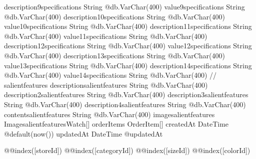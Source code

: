 {  description9specifications  String                      @db.VarChar(400)
  value9specifications        String                      @db.VarChar(400)
  description10specifications String                      @db.VarChar(400)
  value10specifications       String                      @db.VarChar(400)
  description11specifications String                      @db.VarChar(400)
  value11specifications       String                      @db.VarChar(400)
  description12specifications String                      @db.VarChar(400)
  value12specifications       String                      @db.VarChar(400)
  description13specifications String                      @db.VarChar(400)
  value13specifications       String                      @db.VarChar(400)
  description14specifications String                      @db.VarChar(400)
  value14specifications       String                      @db.VarChar(400)
  // salientfeatures
  descriptionsalientfeatures  String                      @db.VarChar(400)
  description2salientfeatures String                      @db.VarChar(400)
  description3salientfeatures String                      @db.VarChar(400)
  description4salientfeatures String                      @db.VarChar(400)
  contentsalientfeatures      String                      @db.VarChar(400)
  imagesalientfeatures   ImagesalientfeaturesWatch[]
  orderItems                  OrderItem[]
  createdAt                   DateTime                    @default(now())
  updatedAt                   DateTime                    @updatedAt

  @@index([storeId])
  @@index([categoryId])
  @@index([sizeId])
  @@index([colorId])
}


